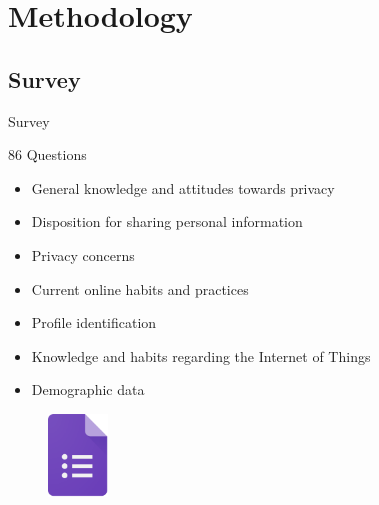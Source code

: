 \documentclass[xcolor={svgnames},compress,aspectratio=169]{beamer}
\begin{document}

\section{Methodology}

\subsection{Survey}

\begin{frame}[shrink]{Survey}
    \begin{multicols}{2}
        86 Questions
        \begin{itemize}
            \item General knowledge and attitudes towards privacy
            \item Disposition for sharing personal information
            \item Privacy concerns
            \item Current online habits and practices
            \item Profile identification
            \item Knowledge and habits regarding the Internet of Things
            \item Demographic data
        \end{itemize}

        \columnbreak
        \vspace*{\fill}
        \begin{figure}
            \centering
            \includegraphics[width=45pt]{assets/images/forms.png}
        \end{figure}
        \vspace*{\fill}
    \end{multicols}
\end{frame}
\end{document}
